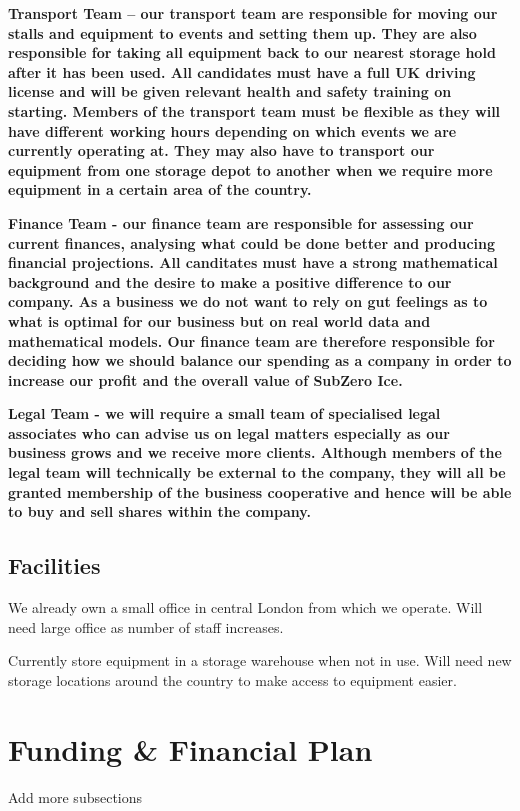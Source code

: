 \documentclass{article}
\begin{document}
\bf{Transport Team} – our transport team are responsible for moving our stalls and equipment to events and setting them up. They are also responsible for taking all equipment back to our nearest storage hold after it has been used. All candidates must have a full UK driving license and will be given relevant health and safety training on starting. Members of the transport team must be flexible as they will have different working hours depending on which events we are currently operating at. They may also have to transport our equipment from one storage depot to another when we require more equipment in a certain area of the country.

 \bf{Finance Team} - our finance team are responsible for assessing our current finances, analysing what could be done better and producing financial projections. All canditates must have a strong mathematical background and the desire to make a positive difference to our company. As a business we do not want to rely on gut feelings as to what is optimal for our business but on real world data and mathematical models. Our finance team are therefore responsible for deciding how we should balance our spending as a company in order to increase our profit and the overall value of SubZero Ice.

 \bf{Legal Team} - we will require a small team of specialised legal associates who can advise us on legal matters especially as our business grows and we receive more clients. Although members of the legal team will technically be external to the company, they will all be granted membership of the business cooperative and hence will be able to buy and sell shares within the company.


  \subsection{Facilities}

  We already own a small office in central London from which we operate.
  Will need large office as number of staff increases.

  Currently store equipment in a storage warehouse when not in use.
  Will need new storage locations around the country to make access to equipment easier.


\section{Funding \& Financial Plan}
Add more subsections
\end{document}
